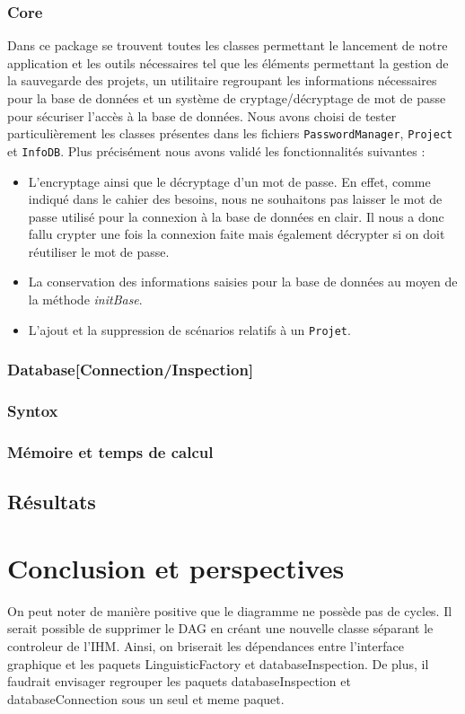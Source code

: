 \documentclass[12pt]{report}
\begin{document}
\subsection{Core}
	Dans ce package se trouvent toutes les classes permettant le lancement de notre application et les outils nécessaires tel que les éléments permettant la gestion de la sauvegarde des projets, un utilitaire regroupant les informations nécessaires pour la base de données et un système de cryptage/décryptage de mot de passe pour sécuriser l'accès à la base de données. 
Nous avons choisi de tester particulièrement les classes présentes dans les fichiers \texttt{PasswordManager}, \texttt{Project} et \texttt{InfoDB}. Plus précisément nous avons validé les fonctionnalités suivantes :
	\begin{itemize}
	\item L'encryptage ainsi que le décryptage d'un mot de passe. En effet, comme indiqué dans le cahier des besoins, nous ne souhaitons pas laisser le mot de passe utilisé pour la connexion à la base de données en clair. Il nous a donc fallu crypter une fois la connexion faite mais également décrypter si on doit réutiliser le mot de passe.
	\item La conservation des informations saisies pour la base de données au moyen de la méthode \emph{initBase}. 
	\item L'ajout et la suppression de scénarios relatifs à un \texttt{Projet}.
	\end{itemize}
	
\subsection{Database[Connection/Inspection]}
\subsection{Syntox}

\subsection{Mémoire et temps de calcul}
	
\section{Résultats}

\chapter{Conclusion et perspectives}
    On peut noter de manière positive que le diagramme ne possède pas de cycles. Il serait possible de supprimer le DAG en créant une nouvelle classe séparant le controleur de l'IHM. Ainsi, on briserait les dépendances entre l'interface graphique et les paquets LinguisticFactory et databaseInspection.
    De plus, il faudrait envisager regrouper les paquets databaseInspection et databaseConnection sous un seul et meme paquet.
\end{document}
